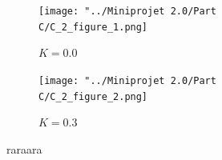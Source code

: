 \documentclass[10pt,a4paper,oneside,twocolumn]{article}
\numberwithin{equation}{section} %
\begin{document}
    \begin{figure}
    \centering
	\begin{subfigure}[b]{\textwidth}
	    \texttt{[image: "../Miniprojet 2.0/Part C/C\_2\_figure\_1.png]}
	    \caption{$K=0.0$}
	\end{subfigure}
	 
	\begin{subfigure}[b]{\textwidth}
	    \texttt{[image: "../Miniprojet 2.0/Part C/C\_2\_figure\_2.png]}
	    \caption{$K=0.3$}
	\end{subfigure}
	\caption{raraara}
    \end{figure}
\end{document}
